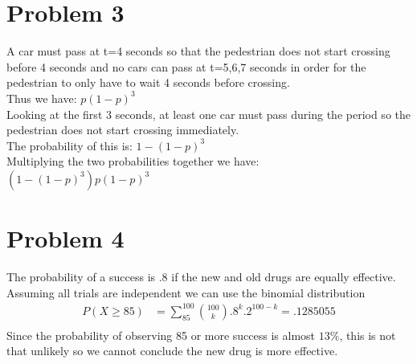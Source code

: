 \documentclass{article}
\begin{document}
\begin{flushleft}
\section*{Problem 3}
A car must pass at t=4 seconds so that the pedestrian does not start crossing before 4 seconds and no cars can pass at t=5,6,7 seconds in order for the pedestrian to only have to wait 4 seconds before crossing.\\
Thus we have: $p(1-p)^3$\\
Looking at the first 3 seconds, at least one car must pass during the period so the pedestrian does not start crossing immediately.\\
The probability of this is: $1-(1-p)^3$\\
Multiplying the two probabilities together we have:\\
$(1-(1-p)^3)p(1-p)^3$\\
\section*{Problem 4}
The probability of a success is .8 if the new and old drugs are equally effective. Assuming all trials are independent we can use the binomial distribution
\begin{align*}
P(X\geq 85)&=\sum_{85}^{100}{100 \choose k}.8^k .2^{100-k} = .1285055\\
\end{align*}
Since the probability of observing 85 or more success is almost $13\%$, this is not that unlikely so we cannot conclude the new drug is more effective.
\pagebreak

\end{flushleft}
\end{document}
